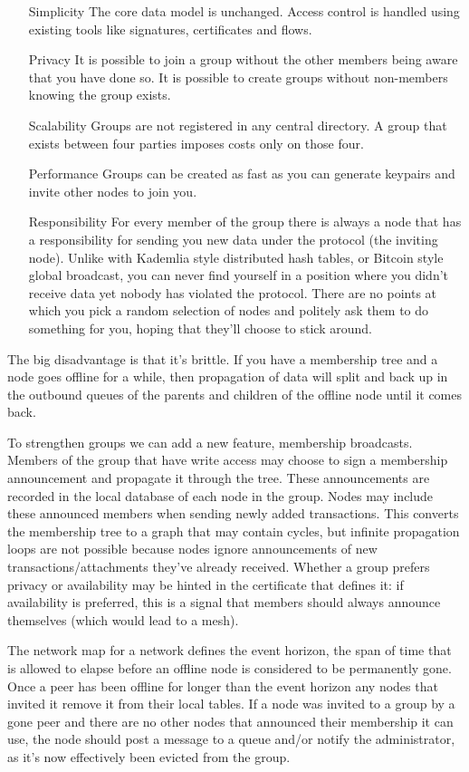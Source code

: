 \documentclass{article}
\begin{document}
\begin{itemize}
\item [Simplicity] The core data model is unchanged. Access control is handled using existing tools like signatures, certificates and flows.
\item [Privacy] It is possible to join a group without the other members being aware that you have done so. It is possible to create groups without non-members knowing the group exists.
\item [Scalability] Groups are not registered in any central directory. A group that exists between four parties imposes costs only on those four.
\item [Performance] Groups can be created as fast as you can generate keypairs and invite other nodes to join you.
\item [Responsibility] For every member of the group there is always a node that has a responsibility for sending you
new data under the protocol (the inviting node). Unlike with Kademlia style distributed hash tables, or Bitcoin style
global broadcast, you can never find yourself in a position where you didn't receive data yet nobody has violated the
protocol. There are no points at which you pick a random selection of nodes and politely ask them to do something for
you, hoping that they'll choose to stick around.
\end{itemize}

The big disadvantage is that it's brittle. If you have a membership tree and a node goes offline for a while, then
propagation of data will split and back up in the outbound queues of the parents and children of the offline node
until it comes back.

To strengthen groups we can add a new feature, membership broadcasts. Members of the group that have write access
may choose to sign a membership announcement and propagate it through the tree. These announcements are recorded in
the local database of each node in the group. Nodes may include these announced members when sending newly added
transactions. This converts the membership tree to a graph that may contain cycles, but infinite propagation loops
are not possible because nodes ignore announcements of new transactions/attachments they've already received.
Whether a group prefers privacy or availability may be hinted in the certificate that defines it: if availability
is preferred, this is a signal that members should always announce themselves (which would lead to a mesh).

The network map for a network defines the event horizon, the span of time that is allowed to elapse before an
offline node is considered to be permanently gone. Once a peer has been offline for longer than the event horizon
any nodes that invited it remove it from their local tables. If a node was invited to a group by a gone peer and
there are no other nodes that announced their membership it can use, the node should post a message to a queue
and/or notify the administrator, as it's now effectively been evicted from the group.
\end{document}
